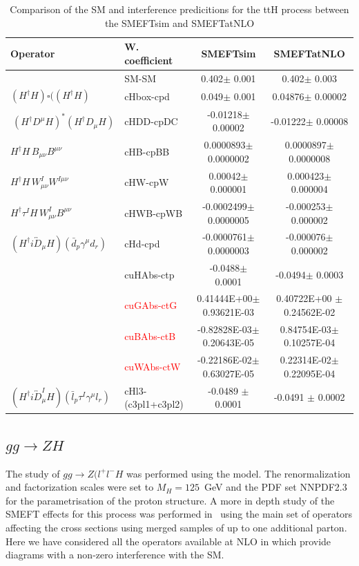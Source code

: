 \begin{center}
\begin{table}[h]
\begin{tabular}{|l|l|c|c|}
\hline
\textbf{Operator}& \textbf{W. coefficient} & \textbf{SMEFTsim} & \textbf{SMEFTatNLO} \\
 \hline
 &  SM-SM & 0.402$\pm$ 0.001& 0.402$\pm$ 0.003\\
 \hline
$(H^{\dagger}H)\square((H^{\dagger}H)$  & cHbox-cpd & 0.049$\pm$ 0.001 & 0.04876$\pm$ 0.00002\\
 \hline
$\ \left(H^\dag D^\mu H\right)^* \left(H^\dag D_\mu H\right)$ & cHDD-cpDC & -0.01218$\pm$ 0.00002 & -0.01222$\pm$ 0.00008\\
 \hline
 $ H^\dag H\, B_{\mu\nu} B^{\mu\nu}$ & cHB-cpBB & 0.0000893$\pm$ 0.0000002 & 0.0000897$\pm$ 0.0000008\\
 \hline
$H^\dag H\, W^I_{\mu\nu} W^{I\mu\nu}$ & cHW-cpW & 0.00042$\pm$ 0.000001& 0.000423$\pm$ 0.000004\\
 \hline
$ H^\dag \tau^I H\, W^I_{\mu\nu} B^{\mu\nu}$ &  cHWB-cpWB & -0.0002499$\pm$ 0.0000005& -0.000253$\pm$ 0.000002\\
 \hline
$(H^\dag i\overleftrightarrow{D}_\mu H)(\bar d_p \gamma^\mu d_r)$ & cHd-cpd & -0.0000761$\pm$ 0.0000003 & -0.000076$\pm$ 0.000002\\
 \hline
 & cuHAbs-ctp & -0.0488$\pm$ 0.0001& -0.0494$\pm$ 0.0003\\
 \hline
 & \textcolor{red}{cuGAbs-ctG} & 0.41444E+00$\pm$ 0.93621E-03& 0.40722E+00 $\pm$ 0.24562E-02\\
 \hline
 & \textcolor{red}{cuBAbs-ctB} & -0.82828E-03$\pm$ 0.20643E-05& 0.84754E-03$\pm$ 0.10257E-04\\
 \hline
 & \textcolor{red}{cuWAbs-ctW} & -0.22186E-02$\pm$ 0.63027E-05& 0.22314E-02$\pm$ 0.22095E-04\\
  \hline
 $(H^\dag i\overleftrightarrow{D}^I_\mu H)(\bar l_p \tau^I \gamma^\mu l_r)$  & cHl3-(c3pl1+c3pl2) & -0.0489 $\pm$ 0.0001 & -0.0491 $\pm$ 0.0002\\
 \hline
  \end{tabular}
\caption{ Comparison of the SM and interference predicitions for the ttH process between the SMEFTsim and SMEFTatNLO}
\end{table}
\end{center}


\subsection{$gg\to ZH$}
\label{sec:higgseft:section3}
The study of  $gg\to Z(l^{+}l^{-}H$ was performed using the \SMEFTatNLO model. The renormalization and factorization scales were set to $M_H=125$~GeV and the PDF set NNPDF2.3 for the parametrisation of the proton structure. A more in depth study of the SMEFT effects for this process was performed in~\cite{Bylund:2016phk} using the main set of operators affecting the cross sections using merged samples of up to one additional parton. Here we have considered all the operators available at NLO in \SMEFTatNLO which provide diagrams with a non-zero interference with the SM.

